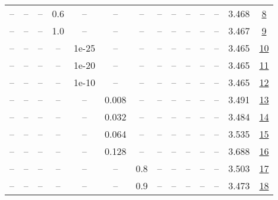 \begin{table}[H]
\begin{tabular}{cccccccccccccc}
-- & -- & -- & 0.6 & -- & -- & -- & -- & -- & -- & -- & -- & 3.468 & \href{https://wandb.ai/stanford-mercury/optimizer-scaling/runs/sweep-130m-2B-muonc0a98clr0.016-wd0.1-minlr0-warmup0-b10.8-b20.9-c9b3e6}{8} \\
-- & -- & -- & 1.0 & -- & -- & -- & -- & -- & -- & -- & -- & 3.467 & \href{https://wandb.ai/stanford-mercury/optimizer-scaling/runs/sweep-130m-2B-muon71f572lr0.016-wd0.1-minlr0-warmup0-b10.8-b20.9-931ae1}{9} \\
-- & -- & -- & -- & 1e-25 & -- & -- & -- & -- & -- & -- & -- & 3.465 & \href{https://wandb.ai/stanford-mercury/optimizer-scaling/runs/sweep-130m-2B-muon132aealr0.016-wd0.1-minlr0-warmup0-b10.8-b20.9-a85203}{10} \\
-- & -- & -- & -- & 1e-20 & -- & -- & -- & -- & -- & -- & -- & 3.465 & \href{https://wandb.ai/stanford-mercury/optimizer-scaling/runs/sweep-130m-2B-muon1ea81alr0.016-wd0.1-minlr0-warmup0-b10.8-b20.9-08c77c}{11} \\
-- & -- & -- & -- & 1e-10 & -- & -- & -- & -- & -- & -- & -- & 3.465 & \href{https://wandb.ai/stanford-mercury/optimizer-scaling/runs/sweep-130m-2B-muonf91efdlr0.016-wd0.1-minlr0-warmup0-b10.8-b20.9-e3d863}{12} \\
-- & -- & -- & -- & -- & 0.008 & -- & -- & -- & -- & -- & -- & 3.491 & \href{https://wandb.ai/stanford-mercury/optimizer-scaling/runs/sweep-130m-2B-muon60167clr0.008-wd0.1-minlr0-warmup0-b10.8-b20.9-9ba062}{13} \\
-- & -- & -- & -- & -- & 0.032 & -- & -- & -- & -- & -- & -- & 3.484 & \href{https://wandb.ai/stanford-mercury/optimizer-scaling/runs/sweep-130m-2B-muonadc334lr0.032-wd0.1-minlr0-warmup0-b10.8-b20.9-0f8112}{14} \\
-- & -- & -- & -- & -- & 0.064 & -- & -- & -- & -- & -- & -- & 3.535 & \href{https://wandb.ai/stanford-mercury/optimizer-scaling/runs/sweep-130m-2B-muon6a313elr0.064-wd0.1-minlr0-warmup0-b10.8-b20.9-6c90c8}{15} \\
-- & -- & -- & -- & -- & 0.128 & -- & -- & -- & -- & -- & -- & 3.688 & \href{https://wandb.ai/stanford-mercury/optimizer-scaling/runs/sweep-130m-2B-muonfd5e36lr0.128-wd0.1-minlr0-warmup0-b10.8-b20.9-e1053e}{16} \\
-- & -- & -- & -- & -- & -- & 0.8 & -- & -- & -- & -- & -- & 3.503 & \href{https://wandb.ai/stanford-mercury/optimizer-scaling/runs/sweep-130m-2B-muon45cb63lr0.016-wd0.1-minlr0-warmup0-b10.8-b20.9-9acb9b}{17} \\
-- & -- & -- & -- & -- & -- & 0.9 & -- & -- & -- & -- & -- & 3.473 & \href{https://wandb.ai/stanford-mercury/optimizer-scaling/runs/sweep-130m-2B-muon87b72elr0.016-wd0.1-minlr0-warmup0-b10.8-b20.9-8a4d9a}{18} \\

\end{tabular}
\end{table}
